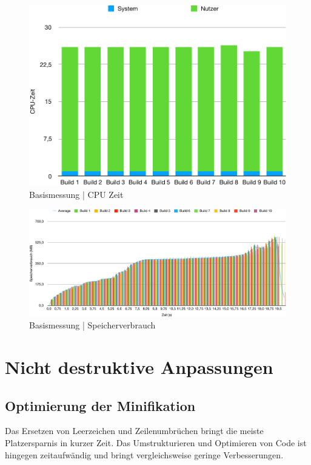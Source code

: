 \documentclass[11pt]{report}
\begin{document}
			\begin{figure}[p]
	            \includegraphics[width=\textwidth]{img/baseline_duration.pdf}
	            \caption{Basismessung | CPU Zeit}
	            \label{figure:baseline_duration}
	        \end{figure}
	        \begin{figure}[p]
	            \includegraphics[width=\textwidth]{img/baseline_memory.pdf}
	            \caption{Basismessung | Speicherverbrauch}
	            \label{figure:baseline_memory}
	        \end{figure}

        \section{Nicht destruktive Anpassungen}
        	\label{section:productionOptimizations}
        	\subsection{Optimierung der Minifikation}
        		\label{section:minification}
	        	Das Ersetzen von Leerzeichen und Zeilenumbrüchen bringt die meiste Platzersparnis in kurzer Zeit. Das Umstrukturieren und Optimieren von Code ist hingegen zeitaufwändig und bringt vergleichsweise geringe Verbesserungen\cite{optimization-source:minify}.
\end{document}
